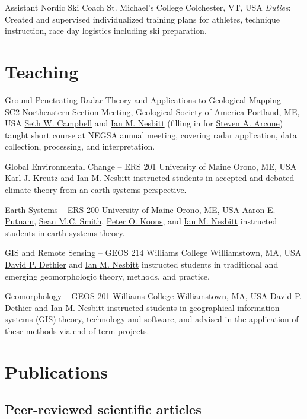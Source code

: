 \documentclass[a4paper,12pt,sans,colorlinks]{moderncv}
\newcommand{\me}{\href{https://www.iannesbitt.org}{Ian M. Nesbitt}}
\newcommand{\seth}{\href{https://www.alpinesciences.net}{Seth W. Campbell}}
\newcommand{\sean}{\href{https://umaine.edu/earthclimate/people/sean-m-c-smith/}{Sean M.C. Smith}}
\newcommand{\stevearcone}{\href{https://engineering.dartmouth.edu/community/faculty/steven-arcone}{Steven A. Arcone}}
\newcommand{\peter}{\href{https://umaine.edu/earthclimate/people/peter-koons/}{Peter O. Koons}}
\newcommand{\aaron}{\href{https://umaine.edu/earthclimate/people/aaron-putnam/}{Aaron E. Putnam}}
\newcommand{\karl}{\href{https://umaine.edu/earthclimate/people/karl-kreutz/}{Karl J. Kreutz}}
\newcommand{\david}{\href{https://geosciences.williams.edu/profile/ddethier/}{David P. Dethier}}
\begin{document}
{Assistant Nordic Ski Coach}
{St. Michael's College}
{Colchester, VT, USA}
{}
{
    \emph{Duties}: Created and supervised individualized training plans
    for athletes, technique instruction, race day logistics including
    ski preparation.
}


\section{Teaching}


{Ground-Penetrating Radar Theory and Applications to Geological
Mapping -- SC2}
{Northeastern Section Meeting, Geological Society of America}
{Portland, ME, USA}
{}
{
    \seth{} and \me{} (filling in for \stevearcone{}) taught
    short course at NEGSA annual meeting, covering radar application,
    data collection, processing, and interpretation.
}

{Global Environmental Change -- ERS 201}
{University of Maine}
{Orono, ME, USA}
{}
{
    \karl{} and \me{} instructed students in accepted and
    debated climate theory from an earth systems perspective.
}

{Earth Systems -- ERS 200}
{University of Maine}
{Orono, ME, USA}
{}
{
    \aaron{}, \sean{}, \peter{}, and \me{} instructed students
    in earth systems theory.
}

{GIS and Remote Sensing -- GEOS 214}
{Williams College}
{Williamstown, MA, USA}
{}
{
    \david{} and \me{} instructed students in traditional and
    emerging geomorphologic theory, methods, and practice.
}

{Geomorphology -- GEOS 201}
{Williams College}
{Williamstown, MA, USA}
{}
{
    \david{} and \me{}
    instructed students in geographical information systems (GIS)
    theory, technology and software, and advised in the
    application of these methods via end-of-term projects.
}




\section{Publications}

\subsection{Peer-reviewed scientific articles}
\end{document}
